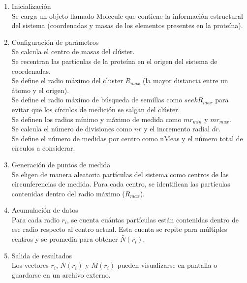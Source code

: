 \begin{enumerate}
	\item Inicializaci\'{o}n\\
	 Se carga un objeto llamado Molecule que contiene la informaci\'{o}n estructural del sistema (coordenadas y masas de los elementos presentes en la prote\'{i}na).
	
	\item Configuraci\'{o}n de par\'{a}metros\\
	Se calcula el centro de masas del cl\'{u}ster.\\
	Se recentran las part\'{i}culas de la prote\'{i}na en el origen del sistema de coordenadas.\\
	Se define el radio m\'{a}ximo del cluster \(R_{max}\) (la mayor distancia entre un \'{a}tomo y el origen).\\
	Se define el radio m\'{a}ximo de b\'{u}squeda de semillas como \(seekR_{max}\) para evitar que los c\'{i}rculos de medici\'{o}n se salgan del cl\'{u}ster.\\
	Se definen los radios m\'{i}nimo y m\'{a}ximo de medida como \(mr_{min}\) y \(mr_{max}\).\\
	Se calcula el n\'{u}mero de divisiones como \(nr\) y el incremento radial \(dr\).\\
	Se define el n\'{u}mero de medidas por centro como nMeas y el n\'{u}mero total de c\'{i}rculos a considerar.
	
	\item Generaci\'{o}n de puntos de medida\\
	Se eligen de manera aleatoria part\'{i}culas del sistema como centros de las circunferencias de medida. Para cada centro, se identifican las part\'{i}culas contenidas dentro del radio m\'{a}ximo (\(R_{max}\)).
	
	\item Acumulaci\'{o}n de datos\\
	Para cada radio \( r_i \), se cuenta cu\'{a}ntas part\'{i}culas est\'{a}n contenidas dentro de ese radio respecto al centro actual. Esta cuenta se repite para m\'{u}ltiples centros y se promedia para obtener \( \bar{N}(r_i) \).
	
	
	\item Salida de resultados\\
	Los vectores \(r_{i}\), \( \bar{N}(r_i) \) y \( \bar{M}(r_i)\) pueden visualizarse en pantalla o guardarse en un archivo externo.
\end{enumerate}




